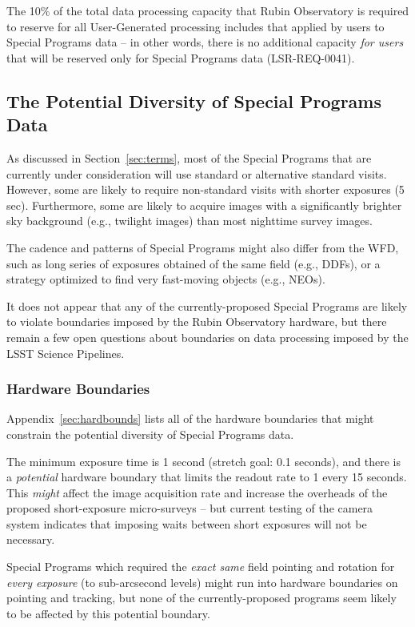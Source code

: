 \documentclass[DM,lsstdoc,toc]{lsstdoc}
\begin{document}
The 10\% of the total data processing capacity that Rubin Observatory is required to reserve for all User-Generated processing includes that applied by users to Special Programs data -- in other words, there is no additional capacity {\it for users} that will be reserved only for Special Programs data (LSR-REQ-0041).



\subsection{The Potential Diversity of Special Programs Data} \label{ssec:proc_datadiv}

As discussed in Section~\ref{sec:terms}, most of the Special Programs that are currently under consideration will use standard or alternative standard visits.
However, some are likely to require non-standard visits with shorter exposures (5 sec).
Furthermore, some are likely to acquire images with a significantly brighter sky background (e.g., twilight images) than most nighttime survey images.

The cadence and patterns of Special Programs might also differ from the WFD, such as long series of exposures obtained of the same field (e.g., DDFs), or a strategy optimized to find very fast-moving objects (e.g., NEOs).

It does not appear that any of the currently-proposed Special Programs are likely to violate boundaries imposed by the Rubin Observatory hardware, but there remain a few open questions about boundaries on data processing imposed by the LSST Science Pipelines.

\subsubsection{Hardware Boundaries}

Appendix~\ref{sec:hardbounds} lists all of the hardware boundaries that might constrain the potential diversity of Special Programs data.

The minimum exposure time is 1 second (stretch goal: 0.1 seconds), and there is a {\it potential} hardware boundary that limits the readout rate to 1 every 15 seconds.
This {\it might} affect the image acquisition rate and increase the overheads of the proposed short-exposure micro-surveys -- but current testing of the camera system indicates that imposing waits between short exposures will not be necessary.

Special Programs which required the \emph{exact same} field pointing and rotation for \emph{every exposure} (to sub-arcsecond levels) might run into hardware boundaries on pointing and tracking, but none of the currently-proposed programs seem likely to be affected by this potential boundary. 
\end{document}
